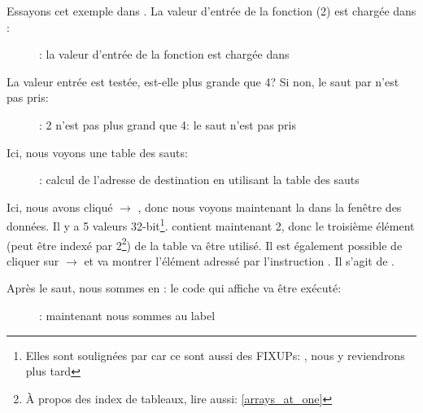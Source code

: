 ﻿\clearpage
\mysubparagraph{\olly}
\myindex{\olly}

Essayons cet exemple dans \olly.
La valeur d'entrée de la fonction (2) est chargée dans \EAX:

\begin{figure}[H]
\centering
{}
\caption{\olly: la valeur d'entrée de la fonction est chargée dans \EAX}
\label{fig:switch_lot_olly1}
\end{figure}

\clearpage
La valeur entrée est testée, est-elle plus grande que 4?
Si non, le saut par  n'est pas pris:
\begin{figure}[H]
\centering
{}
\caption{\olly: 2 n'est pas plus grand que 4: le saut n'est pas pris}
\label{fig:switch_lot_olly2}
\end{figure}

\clearpage
Ici, nous voyons une table des sauts:

\begin{figure}[H]
\centering
{}
\caption{\olly: calcul de l'adresse de destination en utilisant la table des sauts}
\label{fig:switch_lot_olly3}
\end{figure}

Ici, nous avons cliqué  $\rightarrow$ , donc
nous voyons maintenant la  dans la fenêtre des données.
Il y a 5 valeurs 32-bit\footnote{Elles sont soulignées par \olly car ce sont aussi
des FIXUPs: , nous y reviendrons plus tard}.
\ECX contient maintenant 2, donc le troisième élément (peut être indexé par 2\footnote{À
propos des index de tableaux, lire aussi: \ref{arrays_at_one}}) de la table va être
utilisé.
Il est également possible de cliquer sur  $\rightarrow$  et \olly va montrer l'élément adressé par l'instruction \JMP.
Il s'agit de .

\clearpage
Après le saut, nous sommes en : le code qui affiche  va être
exécuté:

\begin{figure}[H]
\centering
{}
\caption{\olly: maintenant nous sommes au  label}
\label{fig:switch_lot_olly4}
\end{figure}
